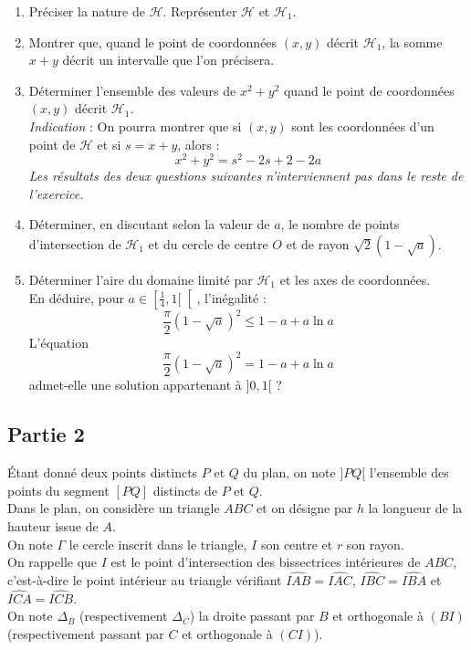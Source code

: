 \documentclass[landscape,twocolumn,leqno,a4paper,10pt]{report} %
\newcommand\n{\noindent}
\renewcommand{\leq}{\leqslant}
\begin{document}
\begin{enumerate}
	\item Préciser la nature de $\mathscr{H}$. Représenter $\mathscr{H}$ et $\mathscr{H}_{1}$.
	\item Montrer que, quand le point de coordonnées $(x, y)$ décrit $\mathscr{H}_{1}$, la somme $x+y$ décrit un intervalle que l'on précisera.
	\item Déterminer l'ensemble des valeurs de $x^{2}+y^{2}$ quand le point de coordonnées $(x, y)$ décrit $\mathscr{H}_{1}$.\\
	\textit{Indication} : On pourra montrer que si $(x, y)$ sont les coordonnées d'un point de $\mathscr{H}$ et si $s=x+y$, alors :
	$$x^{2}+y^{2}=s^{2}-2 s+2-2 a$$
	\textit{Les résultats des deux questions suivantes n'interviennent pas dans le reste de l'exercice.}
	\item Déterminer, en discutant selon la valeur de $a$, le nombre de points d'intersection de $\mathscr{H}_{1}$ et du cercle de centre $O$ et de rayon $\sqrt{2}\left(1-\sqrt{a}\right)$.
	\item Déterminer l'aire du domaine limité par $\mathscr{H}_{1}$ et les axes de coordonnées.\\
	En déduire, pour $a \in\left[\frac{1}{4}, 1[\right[$, l'inégalité :
	$$\frac{\pi}{2}(1-\sqrt{a})^{2} \leq 1-a+a \ln a$$
	L'équation
	$$\frac{\pi}{2}(1-\sqrt{a})^{2}=1-a+a \ln a$$
	admet-elle une solution appartenant à $]0,1[$ ?
\end{enumerate}


\subsection{Partie 2}

\n Étant donné deux points distincts $P$ et $Q$ du plan, on note $]P Q[$ l'ensemble des points du segment $[P Q]$ distincts de $P$ et $Q$.\\
Dans le plan, on considère un triangle $A B C$ et on désigne par $h$ la longueur de la hauteur issue de $A$.\\
On note $\Gamma$ le cercle inscrit dans le triangle, $I$ son centre et $r$ son rayon.\\
On rappelle que $I$ est le point d'intersection des bissectrices intérieures de $A B C$, c'est-à-dire le point intérieur au triangle vérifiant $\widehat{I A B}=\widehat{I A C}$, $\widehat{I B C}=\widehat{I B A}$ et $\widehat{I C A}=\widehat{I C B}$.\\
On note $\Delta_{B}$ (respectivement $\Delta_{C}$) la droite passant par $B$ et orthogonale à $(B I)$ (respectivement passant par $C$ et orthogonale à $(C I)$).
\end{document}
